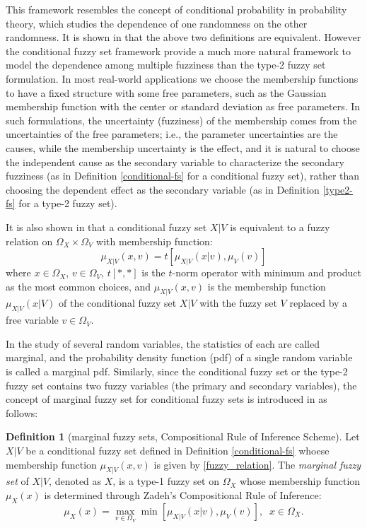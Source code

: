 \documentclass[journal]{IEEEtran}
\theoremstyle{definition}
\newtheorem{definition}{Definition}
\begin{document}
This framework resembles the concept of conditional probability in probability theory, which studies the dependence of one randomness on the other randomness. It is shown in \cite{wang_new_2016} that the above two definitions are equivalent. However the conditional fuzzy set framework provide a much more natural framework to model the dependence among multiple fuzziness than the type-2 fuzzy set formulation.
In most real-world applications we choose the membership functions to have a fixed structure with some free parameters, such as the Gaussian membership function with the center or standard deviation as free parameters. In such formulations, the uncertainty (fuzziness) of the membership comes from the uncertainties of the free parameters; i.e., the parameter uncertainties are the causes, while the membership uncertainty is the effect, and it is natural to choose the independent cause as the secondary variable to characterize the secondary fuzziness (as in Definition \ref{conditional-fs} for a conditional fuzzy set), rather than choosing the dependent effect as the secondary variable (as in Definition \ref{type2-fs} for a type-2 fuzzy set).

It is also shown in \cite{wang_new_2016} that a conditional fuzzy set $X|V$ is equivalent to a fuzzy relation \cite{wang_course_1997} on $\Omega_X\times\Omega_V$ with membership function:
\begin{equation}
\label{fuzzy_relation}
\mu_{X|V}(x,v)=t[\mu_{X|V}(x|v),\mu_V(v)]
\end{equation}
where $x\in\Omega_X$, $v\in\Omega_V$, $t[*,*]$ is the $t$-norm operator with minimum and product as the most common choices, and $\mu_{X|V}(x,v)$ is the membership function $\mu_{X|V}(x|V)$ of the conditional fuzzy set $X|V$ with the fuzzy set $V$  replaced by a free variable $v\in\Omega_V$.

In the study of several random variables, the statistics of each are called marginal, and the probability density function (pdf) of a single random variable is called a marginal pdf. Similarly, since the conditional fuzzy set or the type-2 fuzzy set contains two fuzzy variables (the primary and secondary variables), the concept of marginal fuzzy set for conditional fuzzy sets is introduced in \cite{wang_new_2016} as follows:

\begin{definition}[marginal fuzzy sets, Compositional Rule of Inference Scheme]
\label{marginal-fs}
Let $X|V$ be a conditional fuzzy set defined in Definition \ref{conditional-fs} whoese membership function $\mu_{X|V}(x,v)$ is given by \eqref{fuzzy_relation}. The \emph{marginal fuzzy set} of $X|V$, denoted as $X$, is a type-1 fuzzy set on $\Omega_X$ whose membership function $\mu_X(x)$ is determined through Zadeh's Compositional Rule of Inference:
\begin{equation}
\label{marginal_fs}
\mu_X(x)=\max_{v\in\Omega_V}\min[\mu_{X|V}(x|v),\mu_V(v)],\;\;x\in\Omega_X.
\end{equation}
\end{definition}
\end{document}
